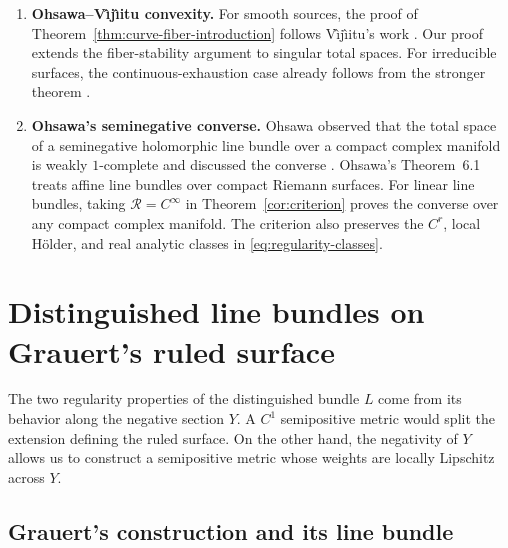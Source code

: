 \documentclass[11pt]{amsart}
\theoremstyle{definition}
\theoremstyle{remark}
\numberwithin{equation}{section}
\begin{document}
\begin{enumerate}[label=\textbf{(\roman*)},widest=iii,leftmargin=*]
\item \textbf{Ohsawa--V\^{\i}j\^{\i}itu convexity.}
For smooth sources, the proof of Theorem~\ref{thm:curve-fiber-introduction}
follows V\^{\i}j\^{\i}itu's work
\cite[Corollary~4.2 and pp.~463--464]{VijituForum2022}.
Our proof extends the fiber-stability argument to singular total spaces.
For irreducible surfaces, the continuous-exhaustion case already
follows from the stronger theorem
\cite[Theorem~1.1]{Vajaitu2022}.

\item \textbf{Ohsawa's seminegative converse.}
Ohsawa observed that the total space of a seminegative holomorphic
line bundle over a compact complex manifold is weakly $1$-complete
and discussed the converse
\cite[\S6, Proposition~6.1 and the following paragraph]{Ohsawa2021}.
Ohsawa's Theorem~6.1 treats affine line bundles over compact Riemann
surfaces. For linear line bundles, taking $\mathcal R=C^\infty$ in
Theorem~\ref{cor:criterion} proves the converse over any compact complex
manifold. The criterion also preserves the $C^r$, local H\"older, and
real analytic classes in \eqref{eq:regularity-classes}.
\end{enumerate}

\section{Distinguished line bundles on Grauert's ruled surface}\label{sec:metrics}

The two regularity properties of the distinguished bundle $L$ come
from its behavior along the negative section $Y$. A $C^1$ semipositive
metric would split the extension defining the ruled surface. On the
other hand, the negativity of $Y$ allows us to construct a semipositive
metric whose weights are locally Lipschitz across $Y$.

\subsection{Grauert's construction and its line bundle}\label{sec:ruled}
\end{document}

